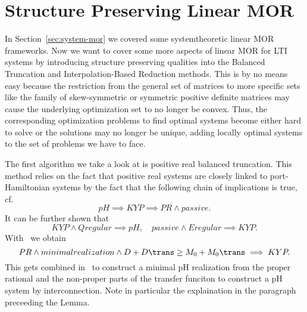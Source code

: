 \section{Structure Preserving Linear MOR}\label{sec:structure-preserving-mor}

In Section~\ref{sec:system-mor} we covered some systemtheoretic linear MOR frameworks.
Now we want to cover some more aspects of linear MOR for LTI systems by introducing structure preserving qualities into the Balanced Truncation and Interpolation-Based Reduction methods.
This is by no means easy because the restriction from the general set of matrices to more specific sets like the family of skew-symmetric or symmetric positive definite matrices may cause the underlying optimization set to no longer be convex.
Thus, the corresponding optimization problems to find optimal systems become either hard to solve or the solutions may no longer be unique, adding locally optimal systems to the set of problems we have to face.


The first algorithm we take a look at is positive real balanced truncation.
This method relies on the fact that positive real systems are closely linked to port-Hamiltonian systems by the fact that the following chain of implications is true, cf.~\cite[Proposition~2.1]{CGH2022}
\begin{equation*}
    pH \implies KYP \implies PR \wedge passive.
\end{equation*}
It can be further shown that
\begin{equation*}
    KYP \wedge Q regular \implies pH,\quad passive \wedge E regular \implies KYP.
\end{equation*}
With~\cite[Proposition~5.4]{CGH2022} we obtain
\begin{equation*}
    PR \wedge minimal realization \wedge D + D\trans \geq M_0 + M_0\trans \implies KYP.
\end{equation*}
This gets combined in~\cite[Lemma~5.6]{CGH2022} to construct a minimal pH realization from the proper rational and the non-proper parts of the transfer funciton to construct a pH system by interconnection.
Note in particular the explaination in the paragraph preceeding the Lemma.



